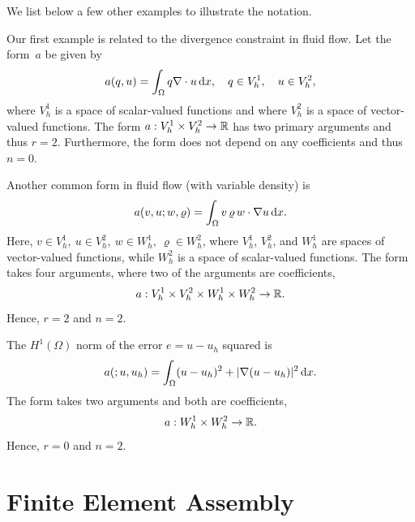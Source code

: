 We list below a few other examples to illustrate the notation.

\begin{example}
\label{example:div}
Our first example is related
to the divergence constraint in fluid flow. Let the form~$a$ be given by
\begin{equation}
a(q, u) = \int_{\Omega} q \nabla \cdot u \, \mathrm{d}x, \quad q\in V_h^1, \quad u\in V_h^2, 
\end{equation}
where $V_h^1$ is a space of scalar-valued functions and where $V_h^2$
is a space of vector-valued functions.  The form $a : V_h^1 \times
V_h^2 \rightarrow \mathbb{R}$ has two primary arguments and thus $r = 2$.
Furthermore, the form does not depend on any coefficients and thus $n=0$.
\end{example}

\begin{example}
\label{example:linearconv}
Another common form in fluid flow (with variable density) is
\begin{equation}
a(v,u;w,\varrho) = \int_{\Omega} v \, \varrho \, w \cdot \nabla  u \, \mathrm{d}x. 
\end{equation}
Here, $v\in V_h^1,\ u \in V_h^2,\ w\in W_h^1, \ \varrho \in W_h^2$, where
$V_h^1$, $V_h^2$, and $W_h^1$ are spaces of vector-valued functions, while $W_h^2$ is a space of  
scalar-valued functions. 
The form takes four arguments, where two of the arguments
are coefficients,
\begin{equation}
a : V_h^1 \times V_h^2 \times W_h^1 \times W_h^2 \rightarrow \mathbb{R}.
\end{equation}
Hence, $r=2$ and $n=2$. 
\end{example}

\begin{example}
The $H^1(\Omega)$ norm of the error $e = u - u_h$ squared is
\begin{equation}
a(;u, u_h) = \int_{\Omega} (u - u_h)^2 + |\nabla (u - u_h)|^2 \, \mathrm{d}x.
\end{equation}
The form takes two arguments and both are coefficients,
\begin{equation}
a : W_h^1 \times  W_h^2 \rightarrow \mathbb{R}.
\end{equation}
Hence, $r=0$ and $n=2$. 
\end{example}

\section{Finite Element Assembly}

